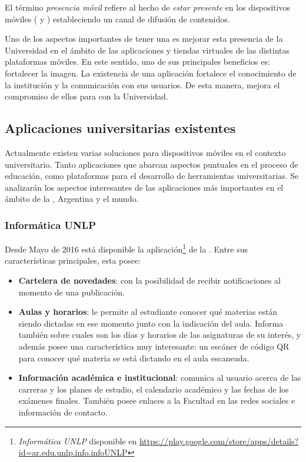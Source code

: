 El término \textit{presencia móvil} refiere al hecho de \textit{estar presente} en los dispositivos móviles ( y ) estableciendo un  canal de difusión de contenidos\cite{presenciaMovilDef}.

Uno de los aspectos importantes de tener una  es mejorar esta presencia de la Universidad  en el ámbito de las aplicaciones y tiendas virtuales de las distintas plataformas móviles. En este sentido, uno de sus principales beneficios es: fortalecer la imagen. La existencia de una aplicación fortalece el conocimiento de la institución y la comunicación con sus usuarios. De esta manera, mejora el compromiso de ellos para con la Universidad\cite{presenciaMovil}.

\subsection{Aplicaciones universitarias existentes}
\label{aplicaciones_universitarias_existentes}

Actualmente existen varias soluciones para dispositivos móviles en el contexto
universitario. Tanto aplicaciones que abarcan aspectos puntuales en el proceso
de educación, como plataformas para el desarrollo de herramientas
universitarias. Se analizarán los aspectos interesantes de las aplicaciones más
importantes en el ámbito de la \unlp, Argentina y el mundo.


\subsubsection{Informática UNLP}
\label{aplicaciones_existentes_unlp_informatica}


Desde Mayo de 2016 está disponible la aplicación\footnote{ \textit{Informática UNLP} disponible en \url{https://play.google.com/store/apps/details?id=ar.edu.unlp.info.infoUNLP} } de la \facultad. Entre sus características principales, esta posee:
\begin{itemize}
\item \textbf{Cartelera de novedades}: con la posibilidad de recibir notificaciones al momento de una publicación.
\item \textbf{Aulas y horarios}: le permite al estudiante conocer qué materias están siendo dictadas en ese momento junto con la indicación del aula. Informa también sobre cuales son los días y horarios de las asignaturas de su interés, y además posee una característica muy interesante: un escáner de código QR para conocer qué materia se está dictando en el aula escaneada.
\item \textbf{Información académica e institucional}: comunica al usuario acerca de las carreras y los planes de estudio, el calendario académico y las fechas de los exámenes finales. También posee enlaces a la Facultad en las redes sociales e información de contacto.
\end{itemize}


